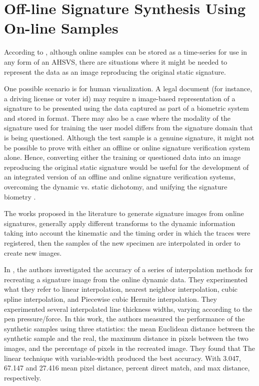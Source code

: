 \section{Off-line Signature Synthesis Using On-line Samples}

According to \cite{guest2013assessment}, although online samples can be stored as a time-series for use in any form of an AHSVS, there are situations where it might be needed to represent the data as an image reproducing the original static signature. 
 
One possible scenario is for human visualization. A legal document (for instance, a driving license or voter id) may require n image-based representation of a signature to be presented using the data captured as part of a biometric system and stored in format. There may also be a case where the modality of the signature used for training the user model differs from the signature domain that is being questioned. Although the test sample is a genuine signature, it might not be possible to prove with either an offline or online signature verification system alone. Hence, converting either the training or questioned data into an image reproducing the original static signature would be useful for the development of an integrated version of an offline and online signature verification systems, overcoming the dynamic vs. static dichotomy, and unifying the signature biometry \cite{chapter}.

The works proposed in the literature to generate signature images from online signatures, generally apply different transforms to the dynamic information taking into account the kinematic and the timing order in which the traces were registered, then the samples of the new specimen are interpolated in order to create new images. 

In \cite{guest2013assessment}, the authors investigated the accuracy of a series of interpolation methods for recreating a signature image from the online dynamic data. They experimented what they refer to linear interpolation, nearest neighbor interpolation, cubic spline interpolation, and Piecewise cubic Hermite interpolation. They experimented several interpolated line thickness widths, varying according to the pen pressure/force. In this work, the authors measured the performance of the synthetic samples using three statistics: the mean Euclidean distance between the synthetic sample and the real, the maximum distance in pixels between the two images, and the percentage of pixels in the recreated image. They found that The linear technique with variable-width produced the best accuracy. With 3.047, 67.147 and 27.416 mean pixel distance, percent direct match, and max distance, respectively.

